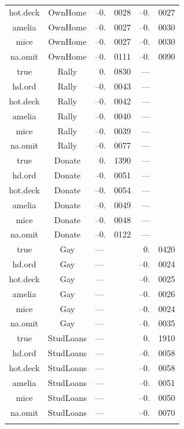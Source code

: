 \documentclass[12pt,econ]{sources/authesis}
\begin{document}
\begin{longtable}{ccr@{}lr@{}l}
 hot.deck & OwnHome & --0.&0028 & --0.&0027 \\
 amelia & OwnHome & --0.&0027 & --0.&0030 \\ 
 mice & OwnHome & --0.&0027 & --0.&0030 \\ 
 na.omit & OwnHome & --0.&0111 & --0.&0090 \\
 true & Rally & 0.&0830 & --- \\ 
 hd.ord & Rally & --0.&0043 & --- \\ 
 hot.deck & Rally & --0.&0042 & --- \\ 
 amelia & Rally & --0.&0040 & --- \\ 
 mice & Rally & --0.&0039 & --- \\ 
 na.omit & Rally & --0.&0077 & --- \\  
 true & Donate & 0.&1390 & --- \\ 
 hd.ord & Donate & --0.&0051 & --- \\ 
 hot.deck & Donate & --0.&0054 & --- \\ 
 amelia & Donate & --0.&0049 & --- \\ 
 mice & Donate & --0.&0048 & --- \\ 
 na.omit & Donate & --0.&0122 & --- \\ 
 true & Gay & \multicolumn{2}{l}{---} & 0.&0420 \\ 
 hd.ord & Gay & \multicolumn{2}{l}{---} & --0.&0024 \\ 
 hot.deck & Gay & \multicolumn{2}{l}{---} & --0.&0025 \\ 
 amelia & Gay & \multicolumn{2}{l}{---} & --0.&0026 \\
 mice & Gay & \multicolumn{2}{l}{---} & --0.&0024 \\ 
 na.omit & Gay & \multicolumn{2}{l}{---} & --0.&0035 \\ 
 true & StudLoans & \multicolumn{2}{l}{---} & 0.&1910 \\
 hd.ord & StudLoans & \multicolumn{2}{l}{---} & --0.&0058 \\
 hot.deck & StudLoans & \multicolumn{2}{l}{---} & --0.&0058 \\ 
 amelia & StudLoans & \multicolumn{2}{l}{---} & --0.&0051 \\ 
 mice & StudLoans & \multicolumn{2}{l}{---} & --0.&0050 \\ 
 na.omit & StudLoans & \multicolumn{2}{l}{---} & --0.&0070 \\ 
 \hline \\[-1.8ex]
 \end{longtable}
\dsp
\end{document}
